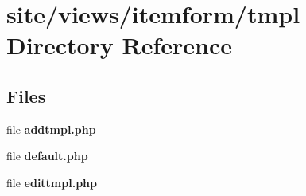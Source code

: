 \section{site/views/itemform/tmpl Directory Reference}
\label{dir_8a3e3772b5b2a1a74c1e94754441a3d7}
\subsection*{Files}
\begin{DoxyCompactItemize}
\item 
file \textbf{ addtmpl.\+php}
\item 
file \textbf{ default.\+php}
\item 
file \textbf{ edittmpl.\+php}
\end{DoxyCompactItemize}
